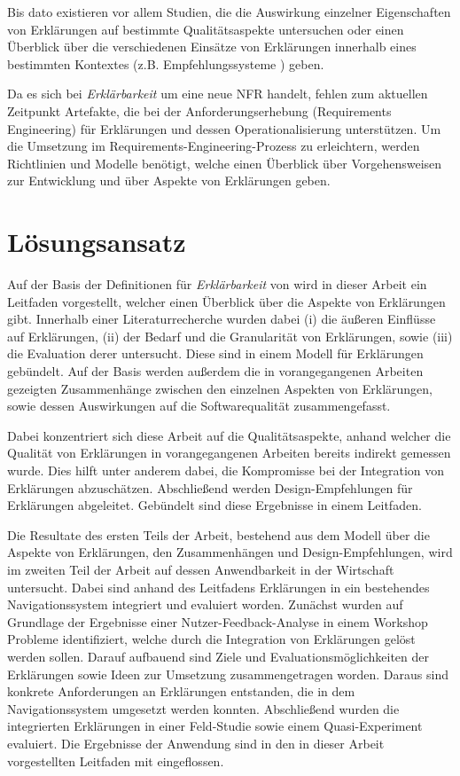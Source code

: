 Bis dato existieren vor allem Studien, die die Auswirkung einzelner Eigenschaften von Erklärungen auf bestimmte Qualitätsaspekte untersuchen oder einen Überblick über die verschiedenen Einsätze von Erklärungen innerhalb eines bestimmten Kontextes (z.B. Empfehlungssysteme \cite{nunes_systematic_2017}) geben.

Da es sich bei \textit{Erklärbarkeit} um eine neue NFR handelt, fehlen zum aktuellen Zeitpunkt Artefakte, die bei der Anforderungserhebung (Requirements Engineering) für Erklärungen und dessen Operationalisierung unterstützen. Um die Umsetzung im Requirements-Engineering-Prozess zu erleichtern, werden Richtlinien und Modelle benötigt, welche einen Überblick über Vorgehensweisen zur Entwicklung und über Aspekte von Erklärungen geben. 

\section{Lösungsansatz}

Auf der Basis der Definitionen für \textit{Erklärbarkeit} von \citeauthor[]{chazette_knowledge_nodate} wird in dieser Arbeit ein Leitfaden vorgestellt, welcher einen Überblick über die Aspekte von Erklärungen gibt. Innerhalb einer Literaturrecherche wurden dabei (i) die äußeren Einflüsse auf Erklärungen, (ii) der Bedarf und die Granularität von Erklärungen, sowie (iii) die Evaluation derer untersucht. Diese sind in einem Modell für Erklärungen gebündelt. Auf der Basis werden außerdem die in vorangegangenen Arbeiten gezeigten Zusammenhänge zwischen den einzelnen Aspekten von Erklärungen, sowie dessen Auswirkungen auf die Softwarequalität zusammengefasst.

Dabei konzentriert sich diese Arbeit auf die Qualitätsaspekte, anhand welcher die Qualität von Erklärungen in vorangegangenen Arbeiten bereits indirekt gemessen wurde. Dies hilft unter anderem dabei, die Kompromisse bei der Integration von Erklärungen abzuschätzen. Abschließend werden  Design-Empfehlungen für Erklärungen abgeleitet. Gebündelt sind diese Ergebnisse in einem Leitfaden.

Die Resultate des ersten Teils der Arbeit, bestehend aus dem Modell über die Aspekte von Erklärungen, den Zusammenhängen und Design-Empfehlungen, wird im zweiten Teil der Arbeit auf dessen Anwendbarkeit in der Wirtschaft untersucht. Dabei sind anhand des Leitfadens Erklärungen in ein bestehendes Navigationssystem integriert und evaluiert worden. Zunächst wurden auf Grundlage der Ergebnisse einer Nutzer-Feedback-Analyse in einem Workshop Probleme identifiziert, welche durch die Integration von Erklärungen gelöst werden sollen. Darauf aufbauend sind Ziele und Evaluationsmöglichkeiten der Erklärungen sowie Ideen zur Umsetzung zusammengetragen worden. Daraus sind konkrete Anforderungen an Erklärungen entstanden, die in dem Navigationssystem umgesetzt werden konnten. Abschließend wurden die integrierten Erklärungen in einer Feld-Studie sowie einem Quasi-Experiment evaluiert. Die Ergebnisse der Anwendung sind in den in dieser Arbeit vorgestellten Leitfaden mit eingeflossen.

